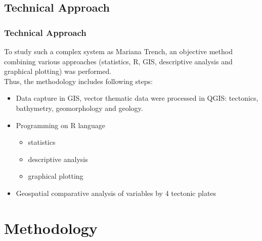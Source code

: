 \documentclass[pdflatex,compress,10pt,
	xcolor={dvipsnames,dvipsnames,svgnames,x11names,table},
	hyperref={colorlinks = true,breaklinks = true, urlcolor = NavyBlue, breaklinks = true}]{beamer}
\begin{document}
\subsection{Technical Approach}
\begin{frame}\frametitle{Technical Approach}
To study such a complex system as Mariana Trench, an objective method combining various approaches (statistics, R, GIS, descriptive analysis and graphical plotting) was performed. \\Thus, the methodology includes following steps:
\begin{itemize}
    \item<1-> Data capture in GIS, vector thematic data were processed in QGIS: tectonics, bathymetry, geomorphology and geology.
    \item<2-> Programming on R language
      \begin{itemize}
            \item statistics
            \item descriptive analysis 
            \item graphical plotting  
        \end{itemize}
      \item<3-> Geospatial comparative analysis of variables by 4 tectonic plates
\end{itemize}
\end{frame}


\section{Methodology}
\end{document}
